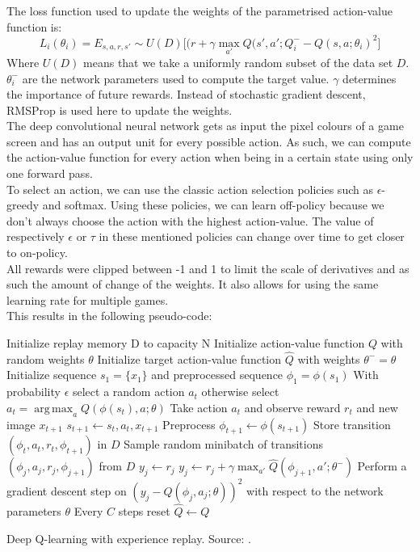 \documentclass[a4paper]{article}
\DeclareMathOperator*{\argmax}{arg\,max}
\begin{document}
The loss function used to update the weights of the parametrised action-value function is:
\begin{equation}
L_i(\theta_i) = E_{s,a,r,s'} \sim U(D) \big [ (r + \gamma \max_{a'} Q(s',a'; Q^{-}_i - Q(s,a;\theta_i)^2 \big ]
\end{equation}
Where $U(D)$ means that we take a uniformly random subset of the data set $D$. $\theta^{-}_i$ are the network parameters used to compute the target value. $\gamma$ determines the importance of future rewards. Instead of stochastic gradient descent, RMSProp is used here to update the weights.\\

The deep convolutional neural network gets as input the pixel colours of a game screen and has an output unit for every possible action. As such, we can compute the action-value function for every action when being in a certain state using only one forward pass.\\

To select an action, we can use the classic action selection policies such as $\epsilon$-greedy and softmax. Using these policies, we can learn off-policy because we don't always choose the action with the highest action-value. The value of respectively $\epsilon$ or $\tau$ in these mentioned policies can change over time to get closer to on-policy.\\

All rewards were clipped between -1 and 1 to limit the scale of derivatives and as such the amount of change of the weights. It also allows for using the same learning rate for multiple games.\\
This results in the following pseudo-code:\\
\begin{algorithm}[H]
\DontPrintSemicolon
Initialize replay memory D to capacity N\;
Initialize action-value function $Q$ with random weights $\theta$\;
Initialize target action-value function $\hat{Q}$ with weights $\theta^- = \theta$\;
 {
	Initialize sequence $s_1 = \{x_1\}$ and preprocessed sequence $\phi_1 = \phi(s_1)$\;
     {
    	With probability $\epsilon$ select a random action $a_t$\;
        otherwise select $a_t = \argmax_a Q(\phi(s_t),a;\theta)$\;
        Take action $a_t$ and observe reward $r_t$ and new image $x_{t+1}$\;
        $s_{t+1} \gets s_t,a_t,x_{t+1}$\;
        Preprocess $\phi_{t+1} \gets \phi(s_{t+1})$\;
        Store transition $(\phi_t,a_t,r_t,\phi_{t+1})$ in $D$\;
        Sample random minibatch of transitions $(\phi_j,a_j,r_j,\phi_{j+1})$ from $D$\;
         {
        	$y_j \gets r_j$\;
        }{
        	$y_j \gets r_j + \gamma \max_{a'} \hat{Q}(\phi_{j+1},a';\theta^-)$\;	
        }
        Perform a gradient descent step on $(y_j - Q(\phi_j,a_j;\theta))^2$ with respect to the network parameters $\theta$\;
        Every $C$ steps reset $\hat{Q} \gets Q$\;
    }
}
\caption{Deep Q-learning with experience replay. Source: \cite{mnih2013playing}.}
\end{algorithm}
\end{document}
